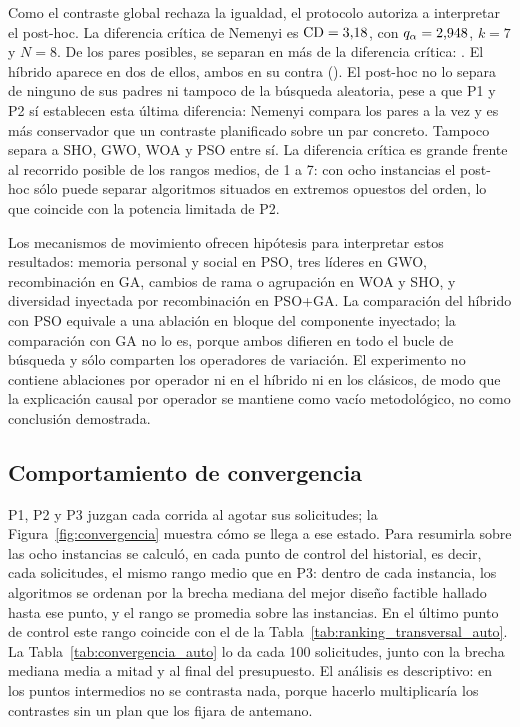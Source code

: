 Como el contraste global rechaza la igualdad, el protocolo autoriza a interpretar el post-hoc. La diferencia crítica de Nemenyi es $\mathrm{CD}=\text{3,18}$, con $q_\alpha=\text{2,948}$, $k=7$ y $N=8$. De los \NemenyiPairsTotal{} pares posibles, \NemenyiPairsCount{} se separan en más de la diferencia crítica: \NemenyiPairs. El híbrido aparece en dos de ellos, ambos en su contra (\NemenyiControlPairs). El post-hoc no lo separa de ninguno de sus padres ni tampoco de la búsqueda aleatoria, pese a que P1 y P2 sí establecen esta última diferencia: Nemenyi compara los \NemenyiPairsTotal{} pares a la vez y es más conservador que un contraste planificado sobre un par concreto. Tampoco separa a SHO, GWO, WOA y PSO entre sí. La diferencia crítica es grande frente al recorrido posible de los rangos medios, de 1 a 7: con ocho instancias el post-hoc sólo puede separar algoritmos situados en extremos opuestos del orden, lo que coincide con la potencia limitada de P2.

Los mecanismos de movimiento ofrecen hipótesis para interpretar estos resultados: memoria personal y social en PSO, tres líderes en GWO, recombinación en GA, cambios de rama o agrupación en WOA y SHO, y diversidad inyectada por recombinación en PSO+GA. La comparación del híbrido con PSO equivale a una ablación en bloque del componente inyectado; la comparación con GA no lo es, porque ambos difieren en todo el bucle de búsqueda y sólo comparten los operadores de variación. El experimento no contiene ablaciones por operador ni en el híbrido ni en los clásicos, de modo que la explicación causal por operador se mantiene como vacío metodológico, no como conclusión demostrada.

\subsection{Comportamiento de convergencia}
\label{sec:convergencia}

P1, P2 y P3 juzgan cada corrida al agotar sus \RequestsPerRun{} solicitudes; la Figura~\ref{fig:convergencia} muestra cómo se llega a ese estado. Para resumirla sobre las ocho instancias se calculó, en cada punto de control del historial, es decir, cada \Population{} solicitudes, el mismo rango medio que en P3: dentro de cada instancia, los algoritmos se ordenan por la brecha mediana del mejor diseño factible hallado hasta ese punto, y el rango se promedia sobre las instancias. En el último punto de control este rango coincide con el de la Tabla~\ref{tab:ranking_transversal_auto}. La Tabla~\ref{tab:convergencia_auto} lo da cada 100 solicitudes, junto con la brecha mediana media a mitad y al final del presupuesto. El análisis es descriptivo: en los puntos intermedios no se contrasta nada, porque hacerlo multiplicaría los contrastes sin un plan que los fijara de antemano.

